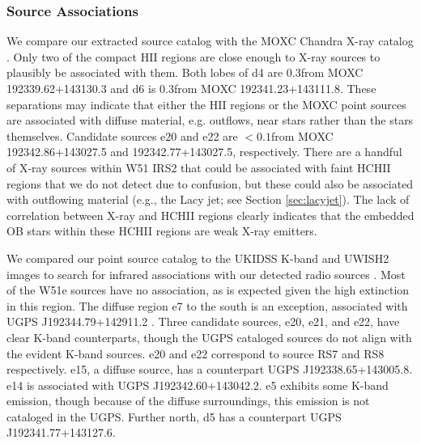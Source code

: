 

\subsubsection{Source Associations}
\label{sec:associations}
We compare our extracted source catalog with the MOXC Chandra X-ray catalog
\citep{Townsley2014a}.  Only two of the compact HII regions are close enough to
X-ray sources to plausibly be associated with them.  Both lobes of d4 are
0.3\arcsec from MOXC 192339.62+143130.3 and d6 is 0.3\arcsec from MOXC
192341.23+143111.8.    These
separations may indicate that either the HII regions or the MOXC point sources
are associated with diffuse material, e.g. outflows,
near stars rather than the stars themselves.  
Candidate sources e20 and e22 are $<0.1$\arcsec from
MOXC 192342.86+143027.5 and 192342.77+143027.5, respectively.
There are a handful of X-ray
sources within W51 IRS2 that could be associated with faint HCHII regions that
we do not detect due to confusion, but these could also be associated with
outflowing material (e.g., the Lacy jet; see Section \ref{sec:lacyjet}).  The
lack of correlation between X-ray and HCHII regions clearly indicates that the
embedded OB stars within these HCHII regions are weak X-ray emitters.  

We compared our point source catalog to the UKIDSS K-band and UWISH2 \hh images to
search for infrared associations with our detected radio sources
\citep{Lucas2012a,Froebrich2011a}.  Most of the W51e sources have no
association, as is expected given the high extinction in this region.  The
diffuse region e7 to the south is an exception, associated with UGPS
J192344.79+142911.2 \citep{Lucas2012a}.  Three candidate sources, e20, e21, and
e22, have clear K-band counterparts, though the UGPS cataloged sources do not align
with the evident K-band sources.  e20 and e22 correspond to \citet{Goldader1994a}
source RS7 and RS8 respectively.  e15, a diffuse source, has a counterpart UGPS
J192338.65+143005.8.  e14 is associated with UGPS J192342.60+143042.2.  e5
exhibits some K-band emission, though because of the diffuse surroundings,
this emission is not cataloged in the UGPS.
Further north, d5 has a counterpart UGPS J192341.77+143127.6.



